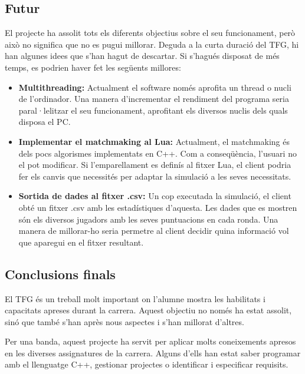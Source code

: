 \documentclass[a4paper]{article}
\begin{document}
\subsection{Futur}

El projecte ha assolit tots els diferents objectius sobre el seu funcionament, però això no significa que no es pugui millorar. Deguda a la curta duració del TFG, hi han algunes idees que s'han hagut de descartar. Si s'hagués disposat de més temps, es podrien haver fet les següents millores:

\begin{itemize}
    \item \textbf{Multithreading:} Actualment el software només aprofita un thread o nucli de l'ordinador. Una manera d'incrementar el rendiment del programa seria paral·lelitzar el seu funcionament, aprofitant els diversos nuclis dels quals disposa el PC.
    
    \item \textbf{Implementar el matchmaking al Lua:} Actualment, el matchmaking és dels pocs algorismes implementats en C++. Com a conseqüència, l'usuari no el pot modificar. Si l'emparellament es definís al fitxer Lua, el client podria fer els canvis que necessités per adaptar la simulació a les seves necessitats.
    
    \item \textbf{Sortida de dades al fitxer .csv:} Un cop executada la simulació, el client obté un fitxer .csv amb les estadístiques d'aquesta. Les dades que es mostren són els diversos jugadors amb les seves puntuacions en cada ronda. Una manera de millorar-ho seria permetre al client decidir quina informació vol que aparegui en el fitxer resultant.
\end{itemize}

\subsection{Conclusions finals}

El TFG és un treball molt important on l'alumne mostra les habilitats i capacitats apreses durant la carrera. Aquest objectiu no només ha estat assolit, sinó que també s'han après nous aspectes i s'han millorat d'altres.

Per una banda, aquest projecte ha servit per aplicar molts coneixements apresos en les diverses assignatures de la carrera. Alguns d'ells han estat saber programar amb el llenguatge C++, gestionar projectes o identificar i especificar requisits.
\end{document}
